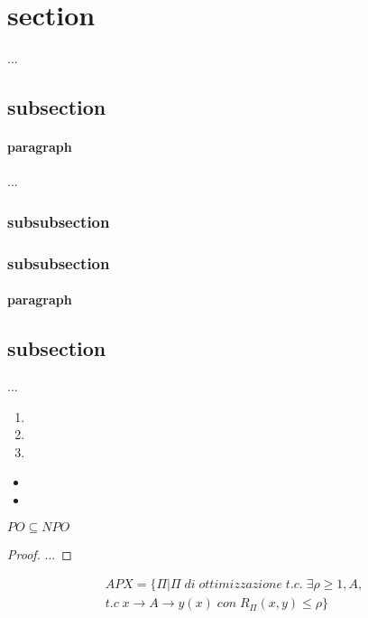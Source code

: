 \section{section}
...

\subsection{subsection}
	
\paragraph{paragraph}

\begin{remark}
    ...
\end{remark}

\subsubsection{subsubsection}

\subsubsection{subsubsection}

\paragraph{paragraph}

\subsection{subsection}
...
\begin{enumerate}
    \item 
    \item
    \item 
\end{enumerate}

\begin{itemize}
	\item 
    \item 
\end{itemize}

\begin{theorem}
    $PO \subseteq NPO$
\end{theorem}
\begin{proof}
    ...
\end{proof}

\begin{equation}
    \begin{aligned}
        \mathit{APX} = \{\Pi | \Pi \mathit{\;di\;ottimizzazione\;t.c.\;}
\exists \rho \geq 1, A, \\\mathit{t.c\;} x\rightarrow A \rightarrow y(x)\;\mathit{con}\;R_\Pi(x, y) \leq \rho\}
    \end{aligned}
\end{equation}


